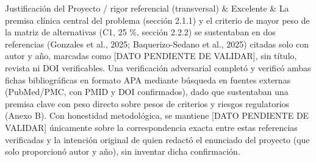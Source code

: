 \documentclass[11pt,a4paper]{article}
\begin{document}
{\begin{longtable}[]
Justificación del Proyecto / rigor referencial (transversal) & Excelente & La premisa clínica central del problema (sección 2.1.1) y el criterio de mayor peso de la matriz de alternativas (C1, 25 \%, sección 2.2.2) se sustentaban en dos referencias (Gonzales et al., 2025; Baquerizo-Sedano et al., 2025) citadas solo con autor y año, marcadas como {[}DATO PENDIENTE DE VALIDAR{]}, sin título, revista ni DOI verificables. Una verificación adversarial completó y verificó ambas fichas bibliográficas en formato APA mediante búsqueda en fuentes externas (PubMed/PMC, con PMID y DOI confirmados), dado que sustentaban una premisa clave con peso directo sobre pesos de criterios y riesgos regulatorios (Anexo B). Con honestidad metodológica, se mantiene {[}DATO PENDIENTE DE VALIDAR{]} únicamente sobre la correspondencia exacta entre estas referencias verificadas y la intención original de quien redactó el enunciado del proyecto (que solo proporcionó autor y año), sin inventar dicha confirmación. \\
\end{longtable}
}
\end{document}
